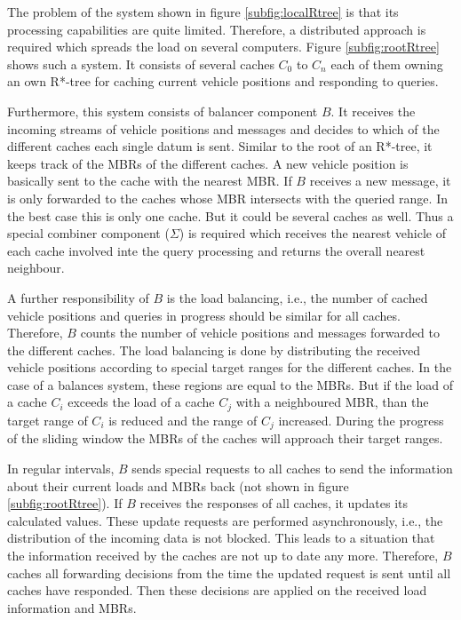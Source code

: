 The problem of the system shown in figure \ref{subfig:localRtree} is that its processing capabilities are quite limited. Therefore, a distributed approach is required which spreads the load on several computers. Figure \ref{subfig:rootRtree} shows such a system. It consists of several caches $C_0$ to $C_n$ each of them owning an own R*-tree for caching current vehicle positions and responding to queries.

Furthermore, this system consists of balancer component $B$. It receives the incoming streams of vehicle positions and messages and decides to which of the different caches each single datum is sent. Similar to the root of an R*-tree, it keeps track of the MBRs of the different caches. A new vehicle position is basically sent to the cache with the nearest MBR. If $B$ receives a new message, it is only forwarded to the caches whose MBR intersects with the queried range. In the best case this is only one cache. But it could be several caches as well. Thus a special combiner component ($\Sigma$) is required which receives the nearest vehicle of each cache involved inte the query processing and returns the overall nearest neighbour.

A further responsibility of $B$ is the load balancing, i.e., the number of cached vehicle positions and queries in progress should be similar for all caches. Therefore, $B$ counts the number of vehicle positions and messages forwarded to the different caches. The load balancing is done by distributing the received vehicle positions according to special target ranges for the different caches. In the case of a balances system, these regions are equal to the MBRs. But if the load of a cache $C_i$ exceeds the load of a cache $C_j$ with a neighboured MBR, than the target range of $C_i$ is reduced and the range of $C_j$ increased. During the progress of the sliding window the MBRs of the caches will approach their target ranges.

In regular intervals, $B$ sends special requests to all caches to send the information about their current loads and MBRs back (not shown in figure \ref{subfig:rootRtree}). If $B$ receives the responses of all caches, it updates its calculated values. These update requests are performed asynchronously, i.e., the distribution of the incoming data is not blocked. This leads to a situation that the information received by the caches are not up to date any more. Therefore, $B$ caches all forwarding decisions from the time the updated request is sent until all caches have responded. Then these decisions are applied on the received load information and MBRs.

